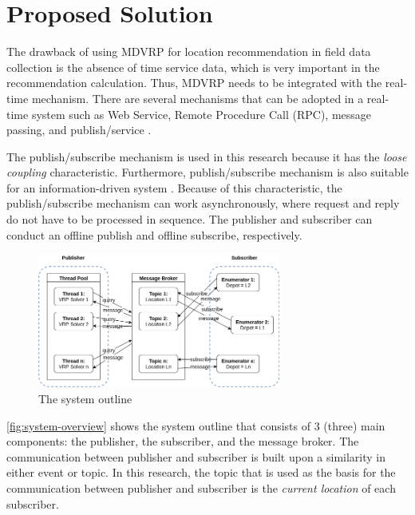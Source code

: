 \documentclass[conference]{IEEEtran}
\begin{document}
\section{Proposed Solution}
\label{sec:proposed-solution}
The drawback of using MDVRP for location recommendation in field data collection is the absence of time service data, which is very important in the recommendation calculation. Thus, MDVRP needs to be integrated with the real-time mechanism. There are several mechanisms that can be adopted in a real-time system such as Web Service, Remote Procedure Call (RPC), message passing, and publish/service \cite{eugster_many_2003}.


The publish/subscribe mechanism is used in this research because it has the \textit{loose coupling} characteristic. Furthermore, publish/subscribe mechanism is also suitable for an information-driven system \cite{muhl_large-scale_2002}. Because of this characteristic, the publish/subscribe mechanism can work asynchronously, where request and reply do not have to be processed in sequence. The publisher and subscriber can conduct an offline publish and offline subscribe, respectively. 


\begin{figure}[h]
	\centering
	\includegraphics[width=8cm]{Resources/Images/system-overview}
	\caption{The system outline}
	\label{fig:system-overview}
\end{figure}


\autoref{fig:system-overview} shows the system outline that consists of 3 (three) main components: the publisher, the subscriber, and the message broker. The communication between publisher and subscriber is built upon a similarity in either event or topic. In this research, the topic that is used as the basis for the communication between publisher and subscriber is the \textit{current location} of each subscriber. 


\end{document}
